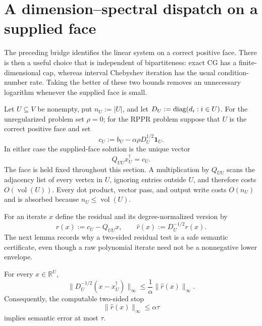\section{A dimension--spectral dispatch on a supplied face}
\label{sec:supplied-face-dispatch}

The preceding bridge identifies the linear system on a correct positive face.
There is then a useful choice that is independent of bipartiteness: exact CG
has a finite-dimensional cap, whereas interval Chebyshev iteration has the
usual condition-number rate.  Taking the better of these two bounds removes
an unnecessary logarithm whenever the supplied face is small.

Let $U\subseteq V$ be nonempty, put $n_U:=|U|$, and let
$D_U:=\operatorname{diag}(d_i:i\in U)$.  For the unregularized problem set $\rho=0$; for
the RPPR problem suppose that $U$ is the correct positive face and set
\begin{equation}
 c_U:=b_U-\alpha\rho D_U^{1/2}\mathbf 1_U.
 \label{eq:supplied-face-load}
\end{equation}
In either case the supplied-face solution is the unique vector
\begin{equation}
 Q_{UU}x_U^\dagger=c_U.
 \label{eq:supplied-face-system}
\end{equation}
The face is held fixed throughout this section.  A multiplication by
$Q_{UU}$ scans the adjacency list of every vertex in $U$, ignoring entries
outside $U$, and therefore costs $O(\operatorname{vol}(U))$.  Every dot
product, vector pass, and output write costs $O(n_U)$ and is absorbed because
$n_U\leq\operatorname{vol}(U)$.

For an iterate $x$ define the residual and its degree-normalized version by
\begin{equation}
 r(x):=c_U-Q_{UU}x,
 \qquad
 \widehat r(x):=D_U^{-1/2}r(x).
 \label{eq:supplied-face-residual}
\end{equation}
The next lemma records why a two-sided residual test is a safe semantic
certificate, even though a raw polynomial iterate need not be a nonnegative
lower envelope.

\begin{lemma}
\label{lem:supplied-face-two-sided-stop}
For every $x\in\mathbb R^U$,
\begin{equation}
 \|D_U^{-1/2}(x-x_U^\dagger)\|_\infty
 \leq \frac1\alpha\|\widehat r(x)\|_\infty.
 \label{eq:supplied-face-residual-semantic}
\end{equation}
Consequently, the computable two-sided stop
\begin{equation}
 \boxed{\ \|\widehat r(x)\|_\infty\leq\alpha\tau\ }
 \label{eq:supplied-face-two-sided-certificate}
\end{equation}
implies semantic error at most $\tau$.
\end{lemma}

